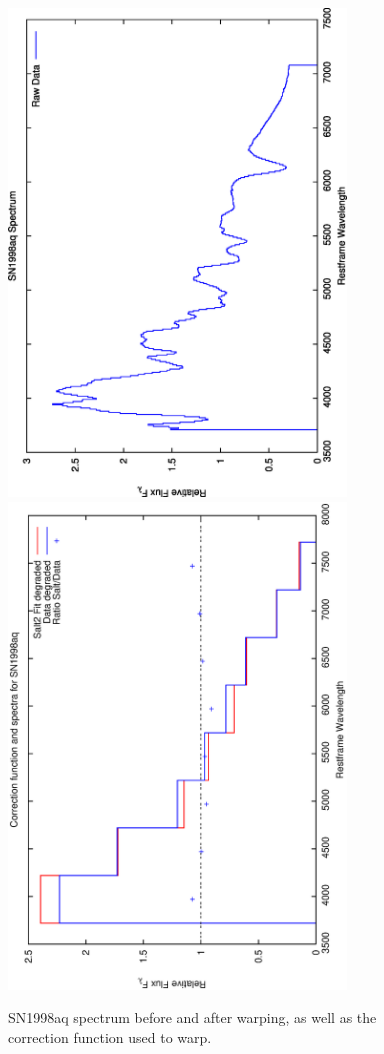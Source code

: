 \clearpage

\begin{figure}[p]
\centering
\includegraphics[angle=-90,width=0.8\textwidth]{./figures/spectrabeforeafter/SN1998aq_handpicked_v001_v027_before_after_spectra.ps}
\hfill
\includegraphics[angle=-90,width=0.8\textwidth]{./figures/corrections/SN1998aq_v001_correction.ps}
\hfill
\caption{SN1998aq spectrum before and after warping, as well as the correction function used to warp.}
\label{fig:SN1998aqfour1}
\end{figure}

